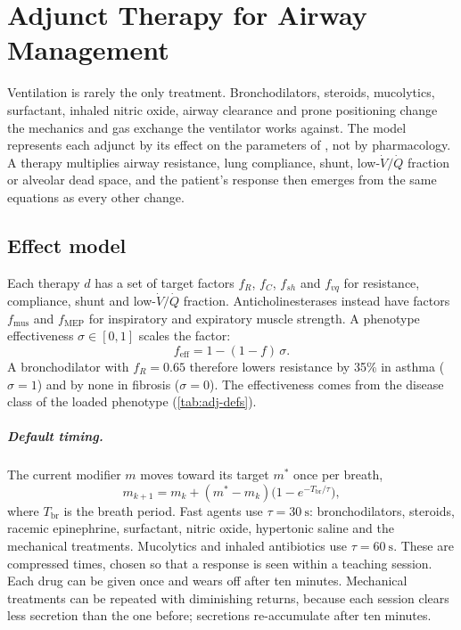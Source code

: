 \chapter{Adjunct Therapy for Airway Management}
\label{ch:adjunct}

Ventilation is rarely the only treatment. Bronchodilators, steroids, mucolytics, surfactant, inhaled nitric oxide, airway clearance and prone positioning change the mechanics and gas exchange the ventilator works against. The model represents each adjunct by its effect on the parameters of , not by pharmacology. A therapy multiplies airway resistance, lung compliance, shunt, low-$\dot V/\dot Q$ fraction or alveolar dead space, and the patient's response then emerges from the same equations as every other change.

\section{Effect model}
\label{sec:adj-model}
Each therapy $d$ has a set of target factors $f_R$, $f_C$, $f_{sh}$ and $f_{vq}$ for resistance, compliance, shunt and low-$\dot V/\dot Q$ fraction. Anticholinesterases instead have factors $f_{\mathrm{mus}}$ and $f_{\mathrm{MEP}}$ for inspiratory and expiratory muscle strength. A phenotype effectiveness $\sigma\in[0,1]$ scales the factor:
\begin{equation}
f_{\mathrm{eff}}=1-(1-f)\,\sigma .
\label{eq:adj-eff}
\end{equation}
A bronchodilator with $f_R=0.65$ therefore lowers resistance by 35\% in asthma ($\sigma=1$) and by none in fibrosis ($\sigma=0$). The effectiveness comes from the disease class of the loaded phenotype (\cref{tab:adj-defs}).

\paragraph{Default timing.} The current modifier $m$ moves toward its target $m^*$ once per breath,
\begin{equation}
m_{k+1}=m_k+(m^*-m_k)\bigl(1-e^{-T_{\mathrm{br}}/\tau}\bigr),
\label{eq:adj-tau}
\end{equation}
where $T_{\mathrm{br}}$ is the breath period. Fast agents use $\tau=\SI{30}{\second}$: bronchodilators, steroids, racemic epinephrine, surfactant, nitric oxide, hypertonic saline and the mechanical treatments. Mucolytics and inhaled antibiotics use $\tau=\SI{60}{\second}$. These are compressed times, chosen so that a response is seen within a teaching session. Each drug can be given once and wears off after ten minutes. Mechanical treatments can be repeated with diminishing returns, because each session clears less secretion than the one before; secretions re-accumulate after ten minutes.

